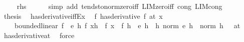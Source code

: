 \begin{isabellebody}
\ \isamarkupfalse%
\ {\isachardoublequoteopen}{\isachardot}{\kern0pt}{\isachardot}{\kern0pt}{\isachardot}{\kern0pt}\ {\isacharequal}{\kern0pt}\ {\isacharquery}{\kern0pt}rhs{\isachardoublequoteclose}\isanewline
\ \ \ \ \isamarkupfalse%
\ {\isacharparenleft}{\kern0pt}simp\ add{\isacharcolon}{\kern0pt}\ tendsto{\isacharunderscore}{\kern0pt}norm{\isacharunderscore}{\kern0pt}zero{\isacharunderscore}{\kern0pt}iff\ LIM{\isacharunderscore}{\kern0pt}zero{\isacharunderscore}{\kern0pt}iff\ cong{\isacharcolon}{\kern0pt}\ LIM{\isacharunderscore}{\kern0pt}cong{\isacharparenright}{\kern0pt}\isanewline
\ \ \isamarkupfalse%
\ \isamarkupfalse%
\ {\isacharquery}{\kern0pt}thesis\ \isacommand{{\isachardot}{\kern0pt}}\isamarkupfalse%
\isanewline
{}\isamarkupfalse%
%
\endisatagproof
{\isafoldproof}%
%
\isadelimproof
\isanewline
%
\endisadelimproof
\isanewline
{}\isamarkupfalse%
\ has{\isacharunderscore}{\kern0pt}derivative{\isacharunderscore}{\kern0pt}iff{\isacharunderscore}{\kern0pt}Ex{\isacharcolon}{\kern0pt}\isanewline
\ \ {\isachardoublequoteopen}{\isacharparenleft}{\kern0pt}f\ has{\isacharunderscore}{\kern0pt}derivative\ f{\isacharprime}{\kern0pt}{\isacharparenright}{\kern0pt}\ {\isacharparenleft}{\kern0pt}at\ x{\isacharparenright}{\kern0pt}\ {\isasymlongleftrightarrow}\isanewline
\ \ \ \ bounded{\isacharunderscore}{\kern0pt}linear\ f{\isacharprime}{\kern0pt}\ {\isasymand}\ {\isacharparenleft}{\kern0pt}{\isasymexists}e{\isachardot}{\kern0pt}\ {\isacharparenleft}{\kern0pt}{\isasymforall}h{\isachardot}{\kern0pt}\ f\ {\isacharparenleft}{\kern0pt}x{\isacharplus}{\kern0pt}h{\isacharparenright}{\kern0pt}\ {\isacharequal}{\kern0pt}\ f\ x\ {\isacharplus}{\kern0pt}\ f{\isacharprime}{\kern0pt}\ h\ {\isacharplus}{\kern0pt}\ e\ h{\isacharparenright}{\kern0pt}\ {\isasymand}\ {\isacharparenleft}{\kern0pt}{\isacharparenleft}{\kern0pt}{\isasymlambda}h{\isachardot}{\kern0pt}\ norm\ {\isacharparenleft}{\kern0pt}e\ h{\isacharparenright}{\kern0pt}\ {\isacharslash}{\kern0pt}\ norm\ h{\isacharparenright}{\kern0pt}\ {\isasymlonglongrightarrow}\ {}{\isacharparenright}{\kern0pt}\ {\isacharparenleft}{\kern0pt}at\ {}{\isacharparenright}{\kern0pt}{\isacharparenright}{\kern0pt}{\isachardoublequoteclose}\isanewline
%
\isadelimproof
\ \ %
\endisadelimproof
%
\isatagproof
{}\isamarkupfalse%
\ has{\isacharunderscore}{\kern0pt}derivative{\isacharunderscore}{\kern0pt}at\ \isamarkupfalse%
\ force%
\endisatagproof
{\isafoldproof}%
%
\isadelimproof
\isanewline

\end{isabellebody}
